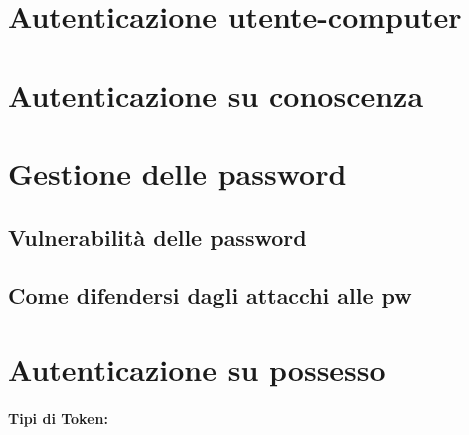 \section{Autenticazione utente-computer}

\section{Autenticazione su conoscenza}

\section{Gestione delle password}

\subsection{Vulnerabilità delle password}

\subsection{Come difendersi dagli attacchi alle pw}

\section{Autenticazione su possesso}

\paragraph{Tipi di Token: }

